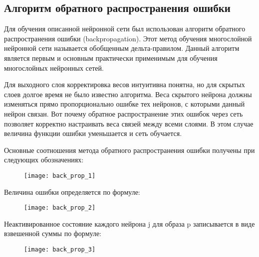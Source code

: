 \documentclass[11pt,colorlinks=true]{article}
\begin{document}
\subsection{Алгоритм обратного распространения ошибки}

Для обучения описанной нейронной сети был использован алгоритм обратного распространения ошибки (backpropagation). Этот метод обучения многослойной нейронной сети называется обобщенным дельта-правилом.  Данный алгоритм является первым и основным практически применимым для обучения многослойных нейронных сетей. 

Для выходного слоя корректировка весов интуитивна понятна, но для скрытых слоев долгое время не было известно алгоритма. Веса скрытого нейрона должны изменяться прямо пропорционально ошибке тех нейронов, с которыми данный нейрон связан. Вот почему обратное распространение этих ошибок через сеть позволяет корректно настраивать веса связей между всеми слоями. В этом случае величина функции ошибки уменьшается и сеть обучается. 

Основные соотношения метода обратного распространения ошибки получены при следующих обозначениях:
\begin{figure}[h]
	\begin{center}
		\begin{minipage}[h]{1\linewidth}
			\texttt{[image: back\_prop\_1]}
		\end{minipage}
	\end{center}
\end{figure}

Величина ошибки определяется по формуле:
\begin{figure}[h]
	\begin{center}
		\begin{minipage}[h]{1\linewidth}
			\texttt{[image: back\_prop\_2]}
		\end{minipage}
	\end{center}
\end{figure}

Неактивированное состояние каждого нейрона j для образа p записывается в виде взвешенной суммы по формуле:
\begin{figure}[!h]
	\begin{center}
		\begin{minipage}[!h]{1\linewidth}
			\texttt{[image: back\_prop\_3]}
		\end{minipage}
	\end{center}
\end{figure}
\end{document}
